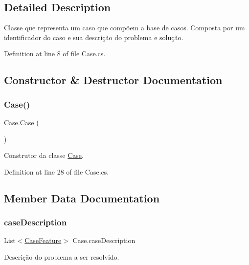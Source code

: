 \subsection{Detailed Description}
Classe que representa um caso que compõem a base de casos. Composta por um identificador do caso e sua descrição do problema e solução. 



Definition at line 8 of file Case.\+cs.



\subsection{Constructor \& Destructor Documentation}
\hypertarget{class_case_a78f4e108e49ef2fed453aa3e6cdd1ada}{}\label{class_case_a78f4e108e49ef2fed453aa3e6cdd1ada} 
\subsubsection{\texorpdfstring{Case()}{Case()}}
{\footnotesize\ttfamily Case.\+Case (\begin{DoxyParamCaption}{ }\end{DoxyParamCaption})}



Construtor da classe \hyperlink{class_case}{Case}. 



Definition at line 28 of file Case.\+cs.



\subsection{Member Data Documentation}
\hypertarget{class_case_a12be58e57891febe52b147a9266e54cb}{}\label{class_case_a12be58e57891febe52b147a9266e54cb} 
\subsubsection{\texorpdfstring{case\+Description}{caseDescription}}
{\footnotesize\ttfamily List$<$\hyperlink{class_case_feature}{Case\+Feature}$>$ Case.\+case\+Description}



Descrição do problema a ser resolvido. 



